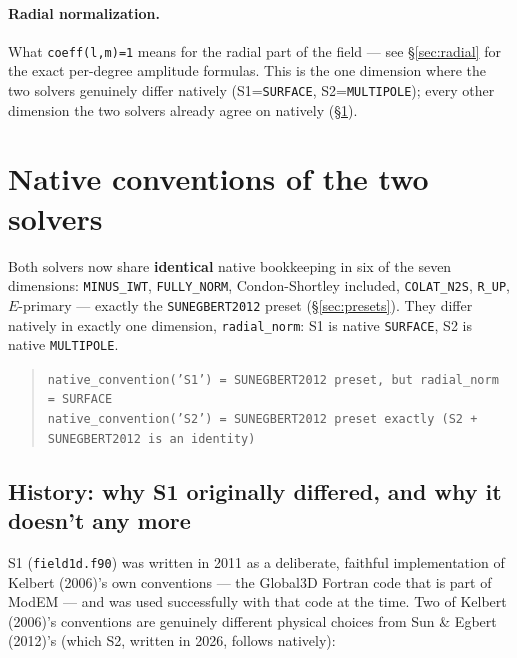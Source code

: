 \documentclass[11pt]{article}
\begin{document}
\paragraph{Radial normalization.} What \texttt{coeff(l,m)=1} means for the radial part of the field
--- see \S\ref{sec:radial} for the exact per-degree amplitude formulas. This is the one dimension
where the two solvers genuinely differ natively (S1=\texttt{SURFACE}, S2=\texttt{MULTIPOLE});
every other dimension the two solvers already agree on natively (\S\ref{sec:native}).

\section{Native conventions of the two solvers}
\label{sec:native}

Both solvers now share \textbf{identical} native bookkeeping in six of the seven dimensions:
\texttt{MINUS\_IWT}, \texttt{FULLY\_NORM}, Condon-Shortley included, \texttt{COLAT\_N2S},
\texttt{R\_UP}, $E$-primary --- exactly the \texttt{SUNEGBERT2012} preset (\S\ref{sec:presets}).
They differ natively in exactly one dimension, \texttt{radial\_norm}: S1 is native
\texttt{SURFACE}, S2 is native \texttt{MULTIPOLE}.

\begin{quote}
\texttt{native\_convention('S1') = SUNEGBERT2012 preset, but radial\_norm = SURFACE} \\
\texttt{native\_convention('S2') = SUNEGBERT2012 preset exactly (S2 + SUNEGBERT2012 is an identity)}
\end{quote}

\subsection*{History: why S1 originally differed, and why it doesn't any more}

S1 (\texttt{field1d.f90}) was written in 2011 as a deliberate, faithful implementation of Kelbert
(2006)'s own conventions --- the Global3D Fortran code that is part of ModEM --- and was used
successfully with that code at the time. Two of Kelbert (2006)'s conventions are genuinely
different physical choices from Sun \& Egbert (2012)'s (which S2, written in 2026, follows
natively):
\end{document}

